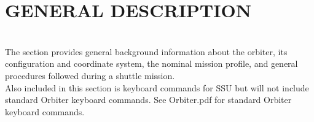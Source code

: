 \documentclass[13pt]{article}
\begin{document}
\section{GENERAL DESCRIPTION}
\begin{multicols*}{2}
\renewcommand{\cfttoctitlefont}{\bf}
\localtableofcontents
\noindent
\\
The section provides general background information about the orbiter, its configuration and coordinate system, the nominal mission profile, and general procedures followed during a shuttle mission.
\\
Also included in this section is keyboard commands for SSU but will not include standard Orbiter keyboard commands. See Orbiter.pdf for standard Orbiter keyboard commands.
\end{multicols*}
\end{document}
